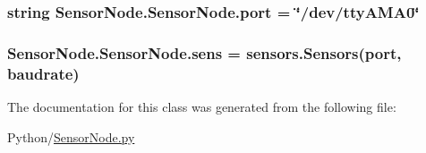 \subsubsection[{\texorpdfstring{port}{port}}]{\setlength{\rightskip}{0pt plus 5cm}string Sensor\+Node.\+Sensor\+Node.\+port = \char`\"{}/dev/tty\+A\+M\+A0\char`\"{}\hspace{0.3cm}{\ttfamily [static]}}\hypertarget{classSensorNode_1_1SensorNode_a94712cd1b0bf09fa4cd3de94ca666575}{}\label{classSensorNode_1_1SensorNode_a94712cd1b0bf09fa4cd3de94ca666575}
\subsubsection[{\texorpdfstring{sens}{sens}}]{\setlength{\rightskip}{0pt plus 5cm}Sensor\+Node.\+Sensor\+Node.\+sens = {\bf sensors.\+Sensors}({\bf port}, {\bf baudrate})\hspace{0.3cm}{\ttfamily [static]}}\hypertarget{classSensorNode_1_1SensorNode_ad8aec254c15c97a8b5c709480f31b2bb}{}\label{classSensorNode_1_1SensorNode_ad8aec254c15c97a8b5c709480f31b2bb}


The documentation for this class was generated from the following file\+:\begin{DoxyCompactItemize}
\item 
Python/\hyperlink{SensorNode_8py}{Sensor\+Node.\+py}\end{DoxyCompactItemize}
